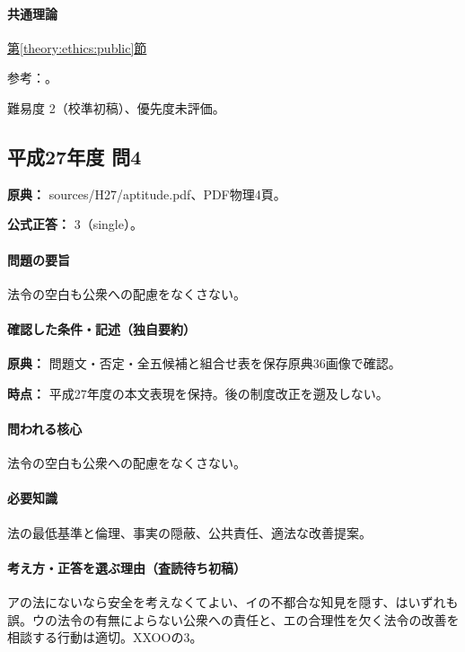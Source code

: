 \paragraph{共通理論} \hyperref[theory:ethics:public]{第\ref*{theory:ethics:public}節}

\par 参考：\cite{ipej_ethics2011}。

\par 難易度 2（校準初稿）、優先度未評価。

\subsection{平成27年度 問4}
\label{q:h27-reg-apt-04}

\noindent\textbf{原典：} sources/H27/aptitude.pdf、PDF物理4頁。

\textbf{公式正答：} 3（single）。

\paragraph{問題の要旨} 法令の空白も公衆への配慮をなくさない。

\paragraph{確認した条件・記述（独自要約）}\mbox{}\par

\noindent\textbf{原典：} 問題文・否定・全五候補と組合せ表を保存原典36画像で確認。\par

\noindent\textbf{時点：} 平成27年度の本文表現を保持。後の制度改正を遡及しない。\par

\paragraph{問われる核心} 法令の空白も公衆への配慮をなくさない。

\paragraph{必要知識} 法の最低基準と倫理、事実の隠蔽、公共責任、適法な改善提案。

\paragraph{考え方・正答を選ぶ理由（査読待ち初稿）} アの法にないなら安全を考えなくてよい、イの不都合な知見を隠す、はいずれも誤。ウの法令の有無によらない公衆への責任と、エの合理性を欠く法令の改善を相談する行動は適切。XXOOの3。

